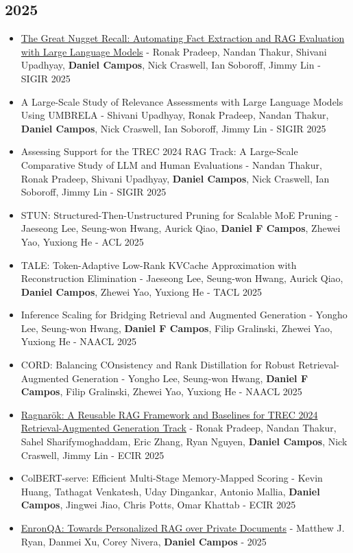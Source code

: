 \documentclass[line,margin]{res}
\begin{document}
\begin{resume}
\subsection{2025}
\begin{itemize}
    \item \href{https://arxiv.org/abs/2504.15068}{The Great Nugget Recall: Automating Fact Extraction and RAG Evaluation with Large Language Models} - Ronak Pradeep, Nandan Thakur, Shivani Upadhyay, \textbf{Daniel Campos}, Nick Craswell, Ian Soboroff, Jimmy Lin - SIGIR 2025
    \item A Large-Scale Study of Relevance Assessments with Large Language Models Using UMBRELA - Shivani Upadhyay, Ronak Pradeep, Nandan Thakur, \textbf{Daniel Campos}, Nick Craswell, Ian Soboroff, Jimmy Lin - SIGIR 2025
    \item Assessing Support for the TREC 2024 RAG Track: A Large-Scale Comparative Study of LLM and Human Evaluations - Nandan Thakur, Ronak Pradeep, Shivani Upadhyay, \textbf{Daniel Campos}, Nick Craswell, Ian Soboroff, Jimmy Lin - SIGIR 2025
    \item STUN: Structured-Then-Unstructured Pruning for Scalable MoE Pruning - Jaeseong Lee, Seung-won Hwang, Aurick Qiao, \textbf{Daniel F Campos}, Zhewei Yao, Yuxiong He - ACL 2025
    \item TALE: Token-Adaptive Low-Rank KVCache Approximation with Reconstruction Elimination - Jaeseong Lee, Seung-won Hwang, Aurick Qiao, \textbf{Daniel Campos}, Zhewei Yao, Yuxiong He - TACL 2025
    \item Inference Scaling for Bridging Retrieval and Augmented Generation - Yongho Lee, Seung-won Hwang, \textbf{Daniel F Campos}, Filip Gralinski, Zhewei Yao, Yuxiong He - NAACL 2025
    \item CORD: Balancing COnsistency and Rank Distillation for Robust Retrieval-Augmented Generation - Yongho Lee, Seung-won Hwang, \textbf{Daniel F Campos}, Filip Gralinski, Zhewei Yao, Yuxiong He - NAACL 2025
    \item \href{https://arxiv.org/abs/2406.16828}{Ragnarök: A Reusable RAG Framework and Baselines for TREC 2024 Retrieval-Augmented Generation Track} - Ronak Pradeep, Nandan Thakur, Sahel Sharifymoghaddam, Eric Zhang, Ryan Nguyen, \textbf{Daniel Campos}, Nick Craswell, Jimmy Lin - ECIR 2025
    \item ColBERT-serve: Efficient Multi-Stage Memory-Mapped Scoring - Kevin Huang, Tathagat Venkatesh, Uday Dingankar, Antonio Mallia, \textbf{Daniel Campos}, Jingwei Jiao, Chris Potts, Omar Khattab - ECIR 2025
    \item \href{https://arxiv.org/abs/2505.00263}{EnronQA: Towards Personalized RAG over Private Documents} - Matthew J. Ryan, Danmei Xu, Corey Nivera, \textbf{Daniel Campos} - 2025
\end{itemize}

\end{resume}
\end{document}
